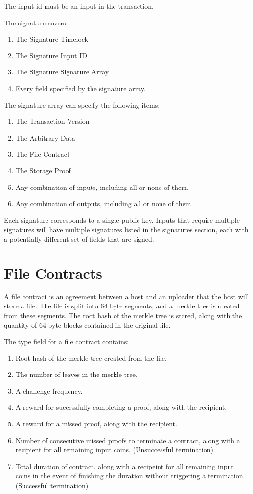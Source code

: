 \documentclass[twocolumn]{article}
\begin{document}
The input id must be an input in the transaction.

The signature covers:
\begin{enumerate}
	\item The Signature Timelock
	\item The Signature Input ID
	\item The Signature Signature Array
	\item Every field specified by the signature array.
\end{enumerate}

The signature array can specify the following items:
\begin{enumerate}
	\item The Transaction Version
	\item The Arbitrary Data
	\item The File Contract
	\item The Storage Proof
	\item Any combination of inputs, including all or none of them.
	\item Any combination of outputs, including all or none of them.
\end{enumerate}

Each signature corresponds to a single public key.
Inputs that require multiple signatures will have multiple signatures listed in the signatures section, each with a potentially different set of fields that are signed.

\section{File Contracts}
A file contract is an agreement between a host and an uploader that the host will store a file.
The file is split into 64 byte segments, and a merkle tree is created from these segments.
The root hash of the merkle tree is stored, along with the quantity of 64 byte blocks contained in the original file.

The type field for a file contract contains:
\begin{enumerate}
	\item Root hash of the merkle tree created from the file.
	\item The number of leaves in the merkle tree.
	\item A challenge frequency.
	\item A reward for successfully completing a proof, along with the recipient.
	\item A reward for a missed proof, along with the recipient.
	\item Number of consecutive missed proofs to terminate a contract, along with a recipient for all remaining input coins. (Unsuccessful termination)
	\item Total duration of contract, along with a recipeint for all remaining input coins in the event of finishing the duration without triggering a termination. (Successful termination)
\end{enumerate}
\end{document}
